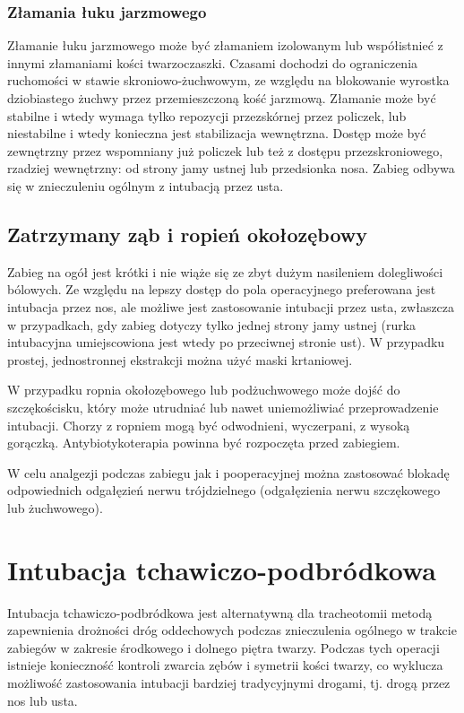 \documentclass[a4paper, 12pt]{report}
\begin{document}
\subsection{Złamania łuku jarzmowego}

Złamanie łuku jarzmowego może być złamaniem izolowanym lub
współistnieć z innymi złamaniami kości twarzoczaszki. Czasami dochodzi
do ograniczenia ruchomości w stawie skroniowo-żuchwowym, ze względu na
blokowanie wyrostka dziobiastego żuchwy przez przemieszczoną kość
jarzmową. Złamanie może być stabilne i wtedy wymaga tylko repozycji
przezskórnej przez policzek, lub niestabilne i wtedy konieczna jest
stabilizacja wewnętrzna. Dostęp może być zewnętrzny przez wspomniany
już policzek lub też z dostępu przezskroniowego, rzadziej wewnętrzny:
od strony jamy ustnej lub przedsionka nosa.  Zabieg odbywa się w
znieczuleniu ogólnym z intubacją przez usta.

\section{Zatrzymany ząb i ropień okołozębowy}

Zabieg na ogół jest krótki i nie wiąże się ze zbyt dużym nasileniem
dolegliwości bólowych. Ze względu na lepszy dostęp do pola
operacyjnego preferowana jest intubacja przez nos, ale możliwe jest
zastosowanie intubacji przez usta, zwłaszcza w przypadkach, gdy zabieg
dotyczy tylko jednej strony jamy ustnej (rurka intubacyjna
umiejscowiona jest wtedy po przeciwnej stronie ust). W przypadku
prostej, jednostronnej ekstrakcji można użyć maski krtaniowej.

W przypadku ropnia okołozębowego lub podżuchwowego może dojść do
szczękościsku, który może utrudniać lub nawet uniemożliwiać
przeprowadzenie intubacji. Chorzy z ropniem mogą być odwodnieni,
wyczerpani, z wysoką gorączką. Antybiotykoterapia powinna być
rozpoczęta przed zabiegiem.

W celu analgezji podczas zabiegu jak i pooperacyjnej można zastosować
blokadę odpowiednich odgałęzień nerwu trójdzielnego (odgałęzienia
nerwu szczękowego lub żuchwowego).

\chapter{Intubacja tchawiczo-podbródkowa}

Intubacja tchawiczo-podbródkowa jest alternatywną dla tracheotomii
metodą zapewnienia drożności dróg oddechowych podczas znieczulenia
ogólnego w trakcie zabiegów w zakresie środkowego i dolnego piętra
twarzy. Podczas tych operacji istnieje konieczność kontroli zwarcia
zębów i symetrii kości twarzy, co wyklucza możliwość zastosowania
intubacji bardziej tradycyjnymi drogami, tj. drogą przez nos lub usta.
\end{document}
